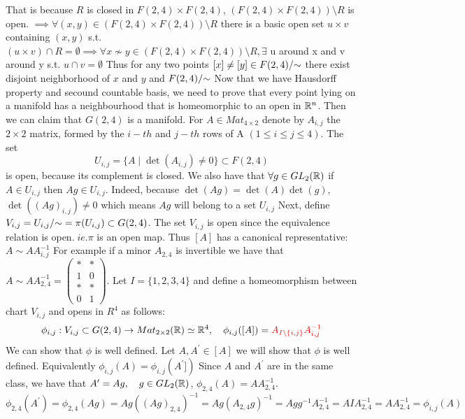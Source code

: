 \documentclass[11pt,a4paper]{report}
\begin{document}
That is because $R$ is closed in $F(2,4) \times F(2,4)$, $(F(2,4) \times F(2,4)) \setminus R$ is open.
$\implies \forall (x,y) \in (F(2,4) \times F(2,4)) \setminus R $ there is a basic open set $u \times v$ containing $(x,y)$ s.t. $ (u \times v) \cap R = \emptyset 
\implies \forall x \nsim y \in (F(2,4) \times F(2,4)) \setminus R , \exists$ u around x and v around y s.t. $u \cap v = \emptyset$
Thus for any two points $[x] \neq [y] \in F(2,4)/{\sim}$ there exist disjoint neighborhood of $x$ and $y$ and $ F(2,4)/{\sim} $
\newline
\newline
Now that we have Hausdorff property and secound countable basis, we need to prove that every point lying on a manifold has a neighbourhood that is homeomorphic to an open in $\mathbb{R}^n$.
Then we can claim that $G(2,4)$ is a manifold.
\newline
For $A \in Mat_{4 \times 2} $ denote by $A_{i,j}$ the $2 \times 2$ matrix, formed by the $i-th$ and $j-th$ rows of A $(1 \leq i \le j \leq 4)$. The set
$$ U_{i,j} = \{ A \; | \; \det(A_{i,j}) \neq 0 \} \subset F(2,4)$$ is open, because its complement is closed. 
We also have that $\forall g \in GL_2(\mathbb{R})$ if $A \in U_{i,j}$ then $ Ag \in U_{i,j}$. 
Indeed, because $\det(Ag) = \det(A) \det(g)$, $\det( (Ag)_{i,j}) \neq 0$ which means $Ag$  will belong to a set $U_{i,j}$ 
Next, define $V_{i,j} = U_{i,j}/{\sim} = \pi (U_{i,j}) \subset G(2,4)$.
The set $V_{i,j}$ is open since the equivalence relation is open.$\; ie. \pi$ is an open map.
Thus $[A]$ has a canonical representative: $A \sim A A_{i,j}^{-1} $
For example if a minor $A_{2,4}$ is invertible we have that
$
A \sim A A_{2,4}^{-1} = 
\begin{pmatrix}
* & * \\
1 & 0 \\
* & * \\
0 & 1
\end{pmatrix}
$.
Let $I = \{ 1,2,3,4 \}$ and  define a homeomorphism between chart $V_{i,j}$ and opens in $R^4$ as follows:
$$ \phi_{i,j}: V_{i,j} \subset G(2,4) \to Mat_{2 \times 2} (\mathbb{R}) \simeq \mathbb{R}^4, \quad \phi_{i,j}([A]) = \textcolor{red}{A_{I \setminus \{ i,j \} }A_{i,j}^{-1}} $$
We can show that $\phi$ is well defined. 
\newline
Let $A, A^\prime \in [A]$ we will show that $\phi$ is well defined. Equivalently $\phi_{i,j}(A) = \phi_{i,j}(A^\prime])$
Since $A$ and $A^\prime$ are in the same class, we have that $A^\prime = A g, \quad g \in GL_2(\mathbb{R})$, $\phi_{2,4}(A) = A A_{2,4}^{-1}$.
$$ \phi_{2,4}(A^\prime) = \phi_{2,4}(A g) = Ag ((Ag)_{2,4})^{-1} = Ag( A_{2,4} g )^{-1} = A g g^{-1} A_{2,4}^{-1} = A I A_{2,4}^{-1} = A A_{2,4}^{-1} = \phi_{i,j}(A) $$
\end{document}
